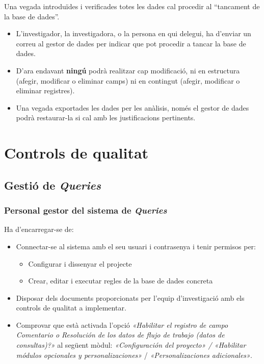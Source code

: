 \documentclass[
]{article}
\providecommand{\tightlist}{%
  \setlength{\itemsep}{0pt}\setlength{\parskip}{0pt}}
\begin{document}
Una vegada introduïdes i verificades totes les dades cal procedir al ``tancament de la base de dades''.

\begin{itemize}
\tightlist
\item
  L'investigador, la investigadora, o la persona en qui delegui, ha d'enviar un correu al gestor de dades per indicar que pot procedir a tancar la base de dades.
\item
  D'ara endavant \textbf{ningú} podrà realitzar cap modificació, ni en estructura (afegir, modificar o eliminar camps) ni en contingut (afegir, modificar o eliminar registres).
\item
  Una vegada exportades les dades per les anàlisis, només el gestor de dades podrà restaurar-la si cal amb les justificacions pertinents.
\end{itemize}

\hypertarget{controls-de-qualitat}{%
\section{\texorpdfstring{\textbf{Controls de qualitat}}{Controls de qualitat}}\label{controls-de-qualitat}}

\hypertarget{gestiuxf3-de-queries}{%
\subsection{\texorpdfstring{\textbf{Gestió de \emph{Queries}}}{Gestió de Queries}}\label{gestiuxf3-de-queries}}

\hypertarget{personal-gestor-del-sistema-de-queries}{%
\subsubsection{\texorpdfstring{\textbf{Personal gestor del sistema de \emph{Queries}}}{Personal gestor del sistema de Queries}}\label{personal-gestor-del-sistema-de-queries}}

Ha d'encarregar-se de:

\begin{itemize}
\tightlist
\item
  Connectar-se al sistema amb el seu usuari i contrasenya i tenir permisos per:

  \begin{itemize}
  \tightlist
  \item
    Configurar i dissenyar el projecte
  \item
    Crear, editar i executar regles de la base de dades concreta
  \end{itemize}
\item
  Disposar dels documents proporcionats per l'equip d'investigació amb els controls de qualitat a implementar.
\item
  Comprovar que està activada l'opció \emph{«Habilitar el registro de campo Comentario o Resolución de los datos de flujo de trabajo (datos de consultas)?»} al següent mòdul: \emph{«Configuración del proyecto» / «Habilitar módulos opcionales y personalizaciones»} / \emph{«Personalizaciones adicionales»}.
\end{itemize}
\end{document}
